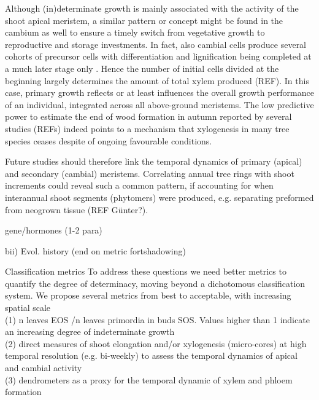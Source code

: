 \documentclass{article}
\begin{document}
Although (in)determinate growth is mainly associated with the activity of the shoot apical meristem, a similar pattern or concept might be found in the cambium as well to ensure a timely switch from vegetative growth to reproductive and storage investments. In fact, also cambial cells produce several cohorts of precursor cells with differentiation and lignification being completed at a much later stage only \citep{valdovinos-ayalaSeasonalPatternsIncreases2022}. Hence the number of initial cells divided at the beginning largely determines the amount of total xylem produced (REF). In this case, primary growth reflects or at least influences the overall growth performance of an individual, integrated across all above-ground meristems. The low predictive power to estimate the end of wood formation in autumn reported by several studies (REFs) indeed points to a mechanism that xylogenesis in many tree species ceases despite of ongoing favourable conditions.

 Future studies should therefore link the temporal dynamics of primary (apical) and secondary (cambial) meristems. Correlating annual tree rings with shoot increments could reveal such a common pattern, if accounting for when interannual shoot segments (phytomers) were produced, e.g. separating preformed from neogrown tissue (REF Günter?).

	

	gene/hormones (1-2 para) %
	
	bii) Evol. history (end on metric fortshadowing) %
	
	
	Classification metrics
	To address these questions we need better metrics to quantify the degree of determinacy, moving beyond a dichotomous classification system. We propose several metrics from best to acceptable, with increasing spatial scale \\
	
	(1) n leaves  EOS /n leaves primordia in buds SOS. Values higher than 1 indicate an increasing degree of indeterminate growth \\
	
	(2) direct measures of shoot elongation and/or xylogenesis (micro-cores) at high temporal resolution (e.g. bi-weekly) to assess the temporal dynamics of apical and cambial activity\\
	
	(3) dendrometers as a proxy for the temporal dynamic of xylem and phloem formation \\
	
\end{document}
